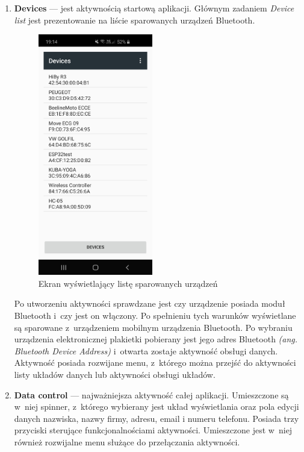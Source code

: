 \documentclass[a4paper,12pt, twoside]{article}
\begin{document}
    	\begin{enumerate}
    	   \item \textbf{Devices} — jest aktywnością startową aplikacji. Głównym zadaniem \textit{Device list} jest prezentowanie na liście  sparowanych urządzeń Bluetooth.
    	   \begin{figure}[H]
    	    \centering
    		    \includegraphics[width=5cm]{images/view_deviceList.jpg}
    			\caption{ Ekran wyświetlający listę sparowanych urządzeń}
                \label{fig:btdevices}
    	   \end{figure}
    	   Po utworzeniu aktywności sprawdzane jest czy urządzenie posiada moduł Bluetooth i~czy jest on włączony. Po spełnieniu tych warunków wyświetlane są sparowane z~urządzeniem mobilnym urządzenia Bluetooth. Po wybraniu urządzenia elektronicznej plakietki pobierany jest jego adres Bluetooth \textit{(ang. Bluetooth Device Address)}\cite{bdaddr} i~otwarta zostaje aktywność obsługi danych. Aktywność posiada rozwijane menu, z~którego można przejść do aktywności listy układów danych lub aktywności obsługi układów.
    	   \item \textbf{Data control} — najważniejsza aktywność całej aplikacji. Umieszczone są w~niej spinner, z~którego wybierany jest układ wyświetlania oraz pola edycji danych nazwiska, nazwy firmy, adresu, email i numeru telefonu. Posiada trzy przyciski sterujące funkcjonalnościami aktywności. Umieszczone jest w~niej również rozwijalne menu służące do przełączania aktywności.
    	   \begin{figure}[H]
    	        \centering
    	        \begin{minipage}{.5\textwidth}

\end{minipage}
\end{figure}
\end{enumerate}
\end{document}
